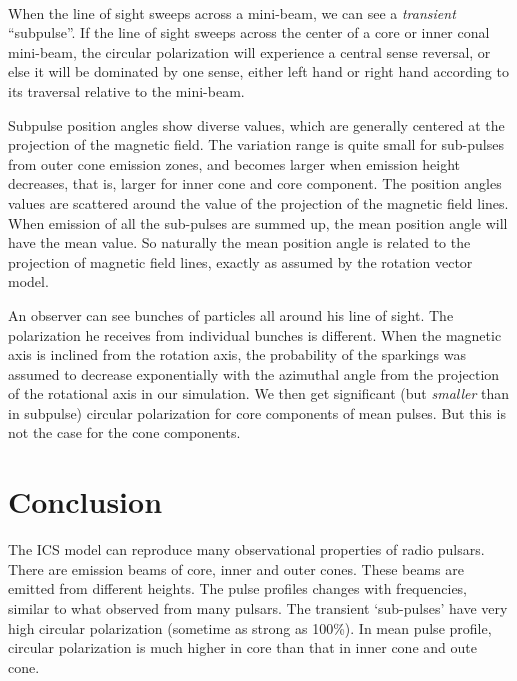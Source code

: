 ~

When the line of sight sweeps across a mini-beam, we can see a
{\it transient} ``subpulse''. If the line of sight sweeps across
the center of a  core or inner conal mini-beam, the circular
polarization will experience a central sense reversal, or else it
will be dominated by one sense, either left hand or right hand
according to its traversal relative to the mini-beam.

\vspace{2mm}


Subpulse position angles show diverse values, which are generally
centered at the projection of the magnetic field. The variation
range is quite small for sub-pulses from outer cone emission
zones, and becomes larger when emission height decreases, that is,
larger for inner cone and core component. The position angles
values are scattered around the value of the projection of the
magnetic field lines. When emission of all the sub-pulses are
summed up, the mean position angle will have the mean value. So
naturally the mean position angle is related to the projection of
magnetic field lines, exactly as assumed by the rotation vector
model.

\vspace{2mm}


An observer can see bunches of particles all around his line of
sight. The polarization he receives from individual bunches is
different. When the magnetic axis is inclined from the rotation
axis, the probability of the sparkings was assumed to decrease
exponentially with the azimuthal angle from the projection of the
rotational axis in our simulation. We then get significant (but
{\it smaller} than in subpulse) circular polarization for core
components of mean pulses. But this is not the case for the cone
components.


\section{Conclusion}

The ICS model can reproduce many observational properties of radio
pulsars. There are emission beams of core, inner and outer cones.
These beams are emitted from different heights. The pulse profiles
changes with frequencies, similar to what observed from many
pulsars. The transient `sub-pulses' have very high circular
polarization (sometime as strong as 100\%). In mean pulse profile,
circular polarization is much higher in core than that in inner
cone and oute cone.

